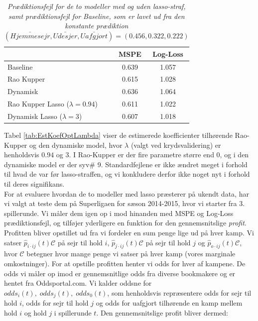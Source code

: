 \documentclass[11pt,a4paper]{article}
\begin{document}
\begin{table}[ht]
\centering
\begin{adjustbox}{max width=\textwidth}
\begin{tabular}{|l|cc|}
\hline 
 & MSPE & Log-Loss  \\
 \hline
Baseline & 0.639 & 1.057 \\
Rao Kupper & 0.615 & 1.028 \\
Dynamisk & 0.636 & 1.064 \\
Rao Kupper Lasso ($\lambda=0.94$)& 0.611 & 1.022 \\
Dynamisk Lasso ($\lambda=3$) & 0.607 & 1.018 \\
   \hline   
\end{tabular} 
\end{adjustbox}
\caption{\label{tab:KVMSPELOGLOSS}\textit{Prædiktionsfejl for de to modeller med og uden lasso-straf, samt prædiktionsfejl for Baseline, som er lavet ud fra den konstante prædiktion $(\bar{Hjemmesejr},\bar{Udesjer}, \bar{Uafgjort}) = (0.456,0.322,0.222)$}}
\end{table}
\newpage
Tabel \ref{tab:EstKoefOptLambda} viser de estimerede koefficienter tilhørende Rao-Kupper og den dynamiske model, hvor $\lambda$ (valgt ved krydsvalidering) er henholdsvis $0.94$ og $3$. I Rao-Kupper er der fire  parametre større end 0, og i den dynamiske model er der syv\# 9. Standardfejlene er ikke ændret meget i forhold til hvad de var før lasso-straffen, og vi konkludere derfor ikke noget nyt i forhold til deres signifikans.\\
For at evaluere hvordan de to modeller med lasso præsterer på ukendt data, har vi valgt at teste dem på Superligaen for sæson 2014-2015, hvor vi starter fra 3. spillerunde. Vi måler dem igen op i mod hinanden med MSPE og Log-Loss prædiktionsfejl, og tilføjer yderligere en funktion for den gennemsnitslige \textit{profit}. Profitten bliver opstillet ud fra vi fordeler en sum penge lige ud på hver kamp. Vi satser $\hat{p}_{i\cdot ij}(t)\mathcal{C}$ på sejr til hold $i$, $\hat{p}_{j\cdot ij}(t)\mathcal{C}$ på sejr til hold $j$ og $\hat{p}_{o\cdot ij}(t)\mathcal{C}$, hvor $\mathcal{C}$ betegner hvor mange penge vi satser på hver kamp (vores marginale omkostninger). For at opstille profitten henter vi odds for hver af kampene. De odds vi måler op imod er gennemsnitlige odds fra diverse bookmakere og er hentet fra Oddsportal.com. Vi kalder oddsne for $odds_i(t),\; odds_j(t), \; odds_0(t)$, som henholdsvis repræsentere odds for sejr til hold $i$, odds for sejr til hold $j$ og odds for uafgjort tilhørende en kamp mellem hold $i$ og hold $j$ i spillerunde $t$. Den gennemsnitslige profit bliver dermed:
\end{document}
